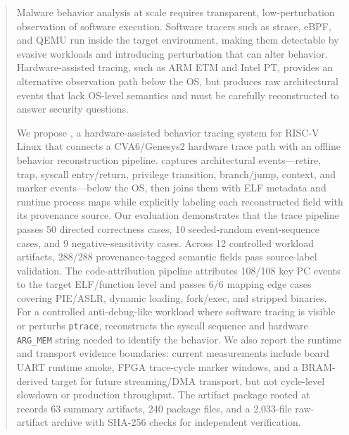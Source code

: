 \begin{abstract}
Malware behavior analysis at scale requires transparent, low-perturbation
observation of software execution. Software tracers such as strace, eBPF, and
QEMU run inside the target environment, making them detectable by evasive
workloads and introducing perturbation that can alter behavior. Hardware-assisted
tracing, such as ARM ETM and Intel PT, provides an alternative observation path
below the OS, but produces raw architectural events that lack OS-level semantics
and must be carefully reconstructed to answer security questions.

We propose \rvmt, a hardware-assisted behavior tracing system for RISC-V Linux
that connects a CVA6/Genesys2 hardware trace path with an offline behavior
reconstruction pipeline. \rvmt captures architectural events---retire, trap,
syscall entry/return, privilege transition, branch/jump, context, and marker
events---below the OS, then joins them with ELF metadata and runtime process maps
while explicitly labeling each reconstructed field with its provenance source. Our
evaluation demonstrates that the trace pipeline passes 50 directed correctness
cases, 10 seeded-random event-sequence cases, and 9 negative-sensitivity cases.
Across 12 controlled workload artifacts, 288/288 provenance-tagged semantic
fields pass source-label validation. The code-attribution pipeline attributes
108/108 key PC events to the target ELF/function level and passes 6/6 mapping
edge cases covering PIE/ASLR, dynamic loading, fork/exec, and stripped binaries.
For a controlled anti-debug-like workload where software tracing is visible or
perturbs \texttt{ptrace}, \rvmt reconstructs the syscall sequence and hardware
\texttt{ARG\_MEM} string needed to identify the behavior. We also report the
runtime and transport evidence boundaries: current measurements include board
UART runtime smoke, FPGA trace-cycle marker windows, and a BRAM-derived target
for future streaming/DMA transport, but not cycle-level slowdown or production
throughput. The artifact package rooted at \artifactroot records 63 summary
artifacts, 240 package files, and a 2,033-file raw-artifact archive with SHA-256
checks for independent verification.
\end{abstract}
